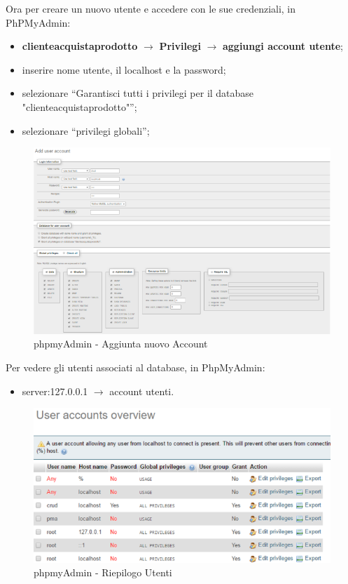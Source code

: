 Ora per creare un nuovo utente e accedere con le sue credenziali, in PhPMyAdmin: 

\begin{itemize}

\item \textbf{clienteacquistaprodotto} $\rightarrow$ \textbf{Privilegi} $\rightarrow$ \textbf{aggiungi account utente}; 
\item inserire nome utente, il localhost e la password;
\item selezionare “Garantisci tutti i privilegi per il database "clienteacquistaprodotto"”;
\item selezionare “privilegi globali”;

\end{itemize}

\begin{center}
\begin{figure}[H]
\centering
\includegraphics[scale=0.8]{figures/adduseraccount.png}
\caption{phpmyAdmin - Aggiunta nuovo Account} 
\end{figure}
\end{center}

Per vedere gli utenti associati al database, in PhpMyAdmin:

\begin{itemize}
\item server:127.0.0.1 $\rightarrow$ account utenti.
\end{itemize}

\begin{center}
\begin{figure}[H]
\centering
\includegraphics[scale=0.8]{figures/useraccountoverview.png}
\caption{phpmyAdmin - Riepilogo Utenti} 
\end{figure}
\end{center}

